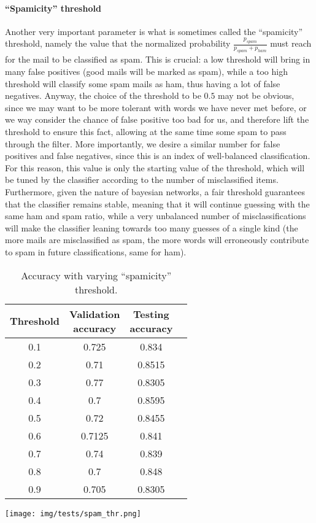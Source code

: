 \paragraph{``Spamicity'' threshold}
\label{spamthrtest} Another very important parameter is what is sometimes called the ``spamicity'' threshold, namely the value that the normalized probability $\frac{p_{spam}}{p_{spam} + p_{ham}}$ must reach for the mail to be classified as spam. This is crucial: a low threshold will bring in many false positives (good mails will be marked as spam), while a too high threshold will classify some spam mails as ham, thus having a lot of false negatives. Anyway, the choice of the threshold to be $0.5$ may not be obvious, since we may want to be more tolerant with words we have never met before, or we way consider the chance of false positive too bad for us, and therefore lift the threshold to ensure this fact, allowing at the same time some spam to pass through the filter. More importantly, we desire a similar number for false positives and false negatives, since this is an index of well-balanced classification. For this reason, this value is only the starting value of the threshold, which will be tuned by the classifier according to the number of misclassified items. Furthermore, given the nature of bayesian networks, a fair threshold guarantees that the classifier remains stable, meaning that it will continue guessing with the same ham and spam ratio, while a very unbalanced number of misclassifications will make the classifier leaning towards too many guesses of a single kind (the more mails are misclassified as spam, the more words will erroneously contribute to spam in future classifications, same for ham).

\begin{center}
\begin{table}[h]
\begin{minipage}{.5\linewidth}
\begin{tabular}{cccc}
\toprule
Threshold & \shortstack{Validation\\ accuracy} & \shortstack{Testing\\ accuracy}\\
\midrule
0.1  & 0.725 & 0.834\\
0.2  & 0.71 & 0.8515 \\
0.3  & 0.77 & 0.8305 \\
0.4  & 0.7 & 0.8595 \\
0.5  & 0.72 & 0.8455 \\
0.6  & 0.7125 & 0.841 \\
0.7  & 0.74 & 0.839 \\
0.8  & 0.7 & 0.848 \\
0.9  & 0.705 & 0.8305 \\
\bottomrule
\end{tabular}
\end{minipage}
\begin{minipage}{.5\linewidth}
\texttt{[image: img/tests/spam\_thr.png]}
    \label{fig:spamthr}
\end{minipage}
\caption{Accuracy with varying ``spamicity'' threshold.}
\end{table}
\label{tab:spamthr}
\end{center}


